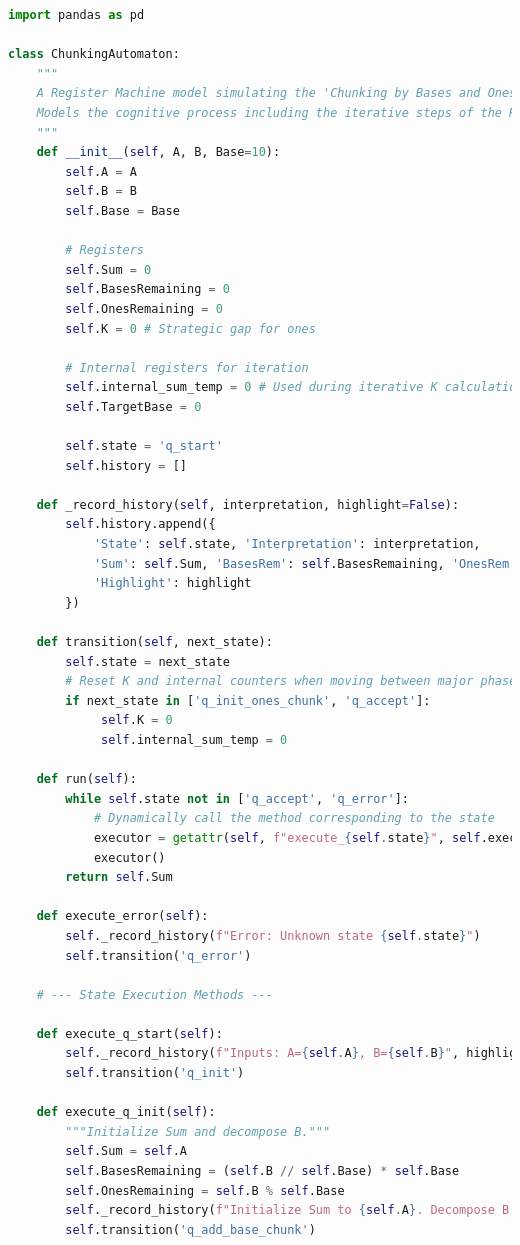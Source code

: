 \documentclass[11pt]{article}
\begin{document}
\begin{lstlisting}[language=Python]
import pandas as pd

class ChunkingAutomaton:
    """
    A Register Machine model simulating the 'Chunking by Bases and Ones' strategy.
    Models the cognitive process including the iterative steps of the RMB subroutine.
    """
    def __init__(self, A, B, Base=10):
        self.A = A
        self.B = B
        self.Base = Base

        # Registers
        self.Sum = 0
        self.BasesRemaining = 0
        self.OnesRemaining = 0
        self.K = 0 # Strategic gap for ones

        # Internal registers for iteration
        self.internal_sum_temp = 0 # Used during iterative K calculation
        self.TargetBase = 0

        self.state = 'q_start'
        self.history = []

    def _record_history(self, interpretation, highlight=False):
        self.history.append({
            'State': self.state, 'Interpretation': interpretation,
            'Sum': self.Sum, 'BasesRem': self.BasesRemaining, 'OnesRem': self.OnesRemaining, 'K': self.K,
            'Highlight': highlight
        })

    def transition(self, next_state):
        self.state = next_state
        # Reset K and internal counters when moving between major phases (e.g., exiting the RMB loop)
        if next_state in ['q_init_ones_chunk', 'q_accept']:
             self.K = 0
             self.internal_sum_temp = 0

    def run(self):
        while self.state not in ['q_accept', 'q_error']:
            # Dynamically call the method corresponding to the state
            executor = getattr(self, f"execute_{self.state}", self.execute_error)
            executor()
        return self.Sum

    def execute_error(self):
        self._record_history(f"Error: Unknown state {self.state}")
        self.transition('q_error')

    # --- State Execution Methods ---

    def execute_q_start(self):
        self._record_history(f"Inputs: A={self.A}, B={self.B}", highlight=True)
        self.transition('q_init')

    def execute_q_init(self):
        """Initialize Sum and decompose B."""
        self.Sum = self.A
        self.BasesRemaining = (self.B // self.Base) * self.Base
        self.OnesRemaining = self.B % self.Base
        self._record_history(f"Initialize Sum to {self.A}. Decompose B: {self.BasesRemaining} + {self.OnesRemaining}.")
        self.transition('q_add_base_chunk')


\end{lstlisting}
\end{document}
